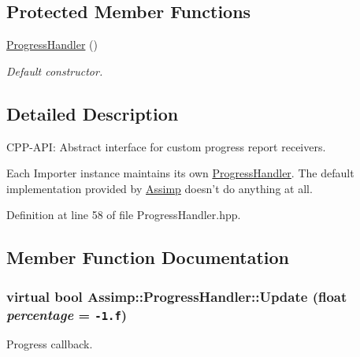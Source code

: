 \subsection*{Protected Member Functions}
\begin{CompactItemize}
\item 
\hypertarget{class_assimp_1_1_progress_handler_53b192913e9904c674b851c46e1ea9e8}{
\hyperlink{class_assimp_1_1_progress_handler_53b192913e9904c674b851c46e1ea9e8}{ProgressHandler} ()}
\label{class_assimp_1_1_progress_handler_53b192913e9904c674b851c46e1ea9e8}

\begin{CompactList}\small\item\em Default constructor. \item\end{CompactList}\end{CompactItemize}


\subsection{Detailed Description}
CPP-API: Abstract interface for custom progress report receivers. 

Each Importer instance maintains its own \hyperlink{class_assimp_1_1_progress_handler_53b192913e9904c674b851c46e1ea9e8}{ProgressHandler}. The default implementation provided by \hyperlink{namespace_assimp}{Assimp} doesn't do anything at all. 

Definition at line 58 of file ProgressHandler.hpp.

\subsection{Member Function Documentation}
\hypertarget{class_assimp_1_1_progress_handler_b08a1d300d434f6dd86ca41747cba448}{
\subsubsection[Update]{\setlength{\rightskip}{0pt plus 5cm}virtual bool Assimp::ProgressHandler::Update (float {\em percentage} = {\tt -1.f})}}
\label{class_assimp_1_1_progress_handler_b08a1d300d434f6dd86ca41747cba448}


Progress callback. 

